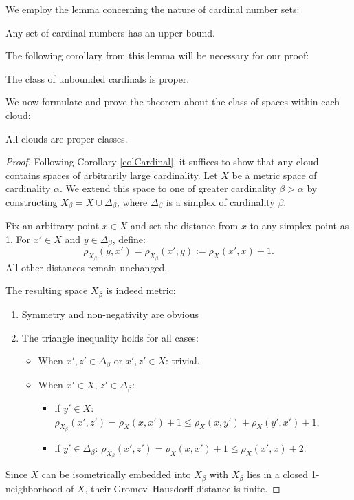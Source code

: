 \documentclass[leqno]{article}
\begin{document}
We employ the lemma concerning the nature of cardinal number sets:

\begin{lemma}
  Any set of cardinal numbers has an upper bound.
\end{lemma}

The following corollary from this lemma will be necessary for our proof:

\begin{corollary}\label{colCardinal}
  The class of unbounded cardinals is proper.
\end{corollary}

We now formulate and prove the theorem about the class of spaces
within each cloud:

\begin{theorem}
  All clouds are proper classes.
\end{theorem}

\begin{proof}
  Following Corollary \ref{colCardinal}, it suffices to show that any
  cloud contains spaces of arbitrarily large cardinality. Let $X$ be
  a metric space of cardinality $\alpha$. We extend this space to one
  of greater cardinality $\beta > \alpha$ by constructing $X_\beta =
  X \cup \Delta_\beta$, where $\Delta_\beta$ is a simplex of
  cardinality $\beta$.

  Fix an arbitrary point $x \in X$ and set the distance from $x$ to
  any simplex point as 1. For $x' \in X$ and $y \in \Delta_\beta$, define:
  $$
  \rho_{X_\beta}(y,x') = \rho_{X_\beta}(x',y) := \rho_X(x',x) + 1.
  $$
  All other distances remain unchanged.

  The resulting space $X_\beta$ is indeed metric:
  \begin{enumerate}
    \item Symmetry and non-negativity are obvious
    \item The triangle inequality holds for all cases:
      \begin{itemize}
        \item When $x', z' \in \Delta_\beta$ or $x', z' \in X$: trivial.
        \item When $x' \in X$, $z' \in \Delta_\beta$:
          \begin{itemize}
            \item if $y' \in X$: $\rho_{X_\beta}(x',z') =
              \rho_X(x,x') + 1 \leq \rho_X(x,y') + \rho_X(y',x') + 1$,
            \item if $y' \in \Delta_\beta$: $\rho_{X_\beta}(x',z') =
              \rho_X(x,x') + 1 \leq \rho_X(x',x) + 2$.
          \end{itemize}
      \end{itemize}
  \end{enumerate}

  Since $X$ can be isometrically embedded into $X_\beta$ with
  $X_\beta$ lies in a closed 1-neighborhood of $X$, their
  Gromov--Hausdorff distance is finite.
\end{proof}
\end{document}
